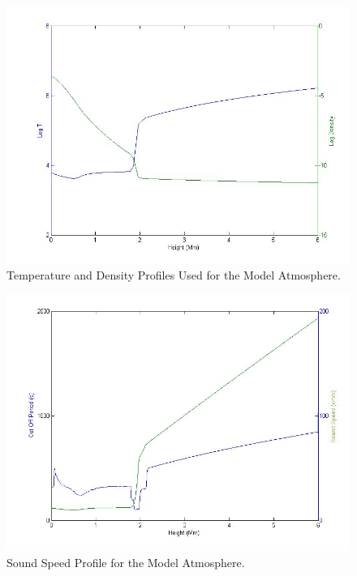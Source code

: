 \documentclass[final,1p]{elsarticle}
\begin{document}



\begin{figure}[h]
\includegraphics[scale=0.6]{images/VAL3C_rho_temp_fig2.jpg}
\caption{Temperature and Density Profiles Used for the Model Atmosphere. }
\end{figure}


\begin{figure}[h]
\includegraphics[scale=0.5]{images/soundspeedVAL3C_profile_fig3}
\caption{Sound Speed Profile for the Model Atmosphere. }
\end{figure}
\end{document}
